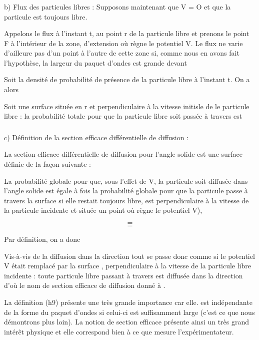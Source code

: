 
\subsubsection{}%
b) Flux des particules libres :
Supposons maintenant que V = O et que la particule est
toujours libre.

 Appelons le flux à l'instant t, au point r de la
particule libre et prenons le point F à l'intérieur de la zone, d'extension
où règne le potentiel V. Le flux  ne varie d'ailleure pas
d'un point à l'autre de cette zone si, comme nous en avons fait l'hypothèse,
la largeur du paquet d'ondes est grande devant

Soit  la densité de probabilité de présence de la
particule libre  à l'instant t. On a alors

Soit  une surface située en r et perpendiculaire à la vitesse initisle
de le particule libre : la probabilité totale pour que la particule
libre soit passée à travers  est

\subsubsection{}%
c) Définition de la section efficace différentielle de diffusion :

La section efficace différentielle de diffusion pour
l'angle solide  est une surface  définie de la façon suivante :

La probabilité globale pour que, sous l'effet de V, la particule soit diffusée
dans l'angle solide  est égale à  fois
la probabilité globale pour que la particule passe à travers la surface
 si elle restait toujours libre,  est perpendiculaire à la
vitesse de la particule incidente et située  un point  où règne le
potentiel V),

\[
\tag{49}=
\]
\[
\tag{50}=
\]

Par définition, on a donc

Vis-à-vis de la diffusion dans la direction  tout se passe donc comme
si le potentiel V était remplacé par la surface , perpendiculaire
à la vitesse de la particule libre incidente : toute particule libre passant à
travers  est diffusée dans la direction  d'où le nom de
section efficace de diffusion donné à .

La définition (h9) présente une très grande importance car elle.
est indépendante de la forme du paquet d'ondes si celui-ci est suffisamment large
(c'est ce que nous démontrons plus loin). La notion de section
efficace présente ainsi un très grand intérêt physique et elle correspond
bien à ce que mesure l'expérimentateur.

